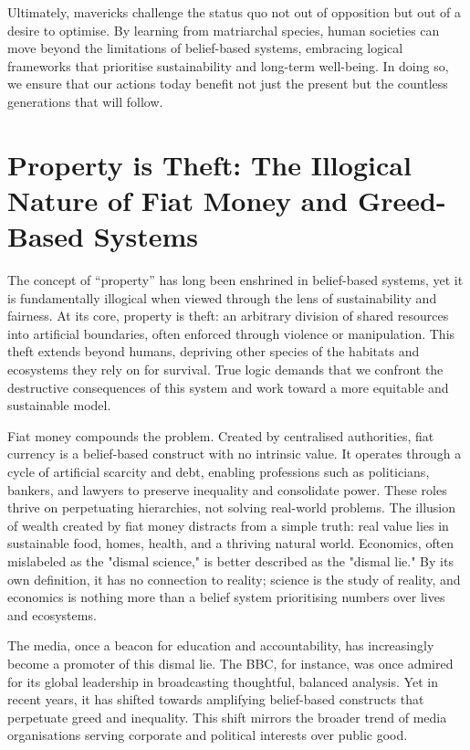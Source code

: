 \documentclass[12pt]{article}
\begin{document}
Ultimately, mavericks challenge the status quo not out of opposition but out of a desire to optimise. By learning from matriarchal species, human societies can move beyond the limitations of belief-based systems, embracing logical frameworks that prioritise sustainability and long-term well-being. In doing so, we ensure that our actions today benefit not just the present but the countless generations that will follow.

\section*{Property is Theft: The Illogical Nature of Fiat Money and Greed-Based Systems}

The concept of “property” has long been enshrined in belief-based systems, yet it is fundamentally illogical when viewed through the lens of sustainability and fairness. At its core, property is theft: an arbitrary division of shared resources into artificial boundaries, often enforced through violence or manipulation. This theft extends beyond humans, depriving other species of the habitats and ecosystems they rely on for survival. True logic demands that we confront the destructive consequences of this system and work toward a more equitable and sustainable model.

Fiat money compounds the problem. Created by centralised authorities, fiat currency is a belief-based construct with no intrinsic value. It operates through a cycle of artificial scarcity and debt, enabling professions such as politicians, bankers, and lawyers to preserve inequality and consolidate power. These roles thrive on perpetuating hierarchies, not solving real-world problems. The illusion of wealth created by fiat money distracts from a simple truth: real value lies in sustainable food, homes, health, and a thriving natural world. Economics, often mislabeled as the "dismal science," is better described as the "dismal lie." By its own definition, it has no connection to reality; science is the study of reality, and economics is nothing more than a belief system prioritising numbers over lives and ecosystems.

The media, once a beacon for education and accountability, has increasingly become a promoter of this dismal lie. The BBC, for instance, was once admired for its global leadership in broadcasting thoughtful, balanced analysis. Yet in recent years, it has shifted towards amplifying belief-based constructs that perpetuate greed and inequality. This shift mirrors the broader trend of media organisations serving corporate and political interests over public good.
\end{document}
